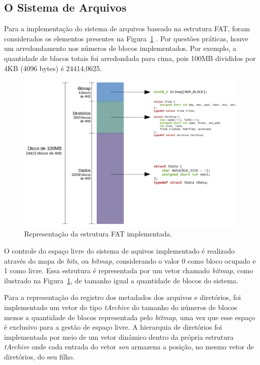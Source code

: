\documentclass[12pt]{article}
\begin{document}
\subsection{O Sistema de Arquivos}

Para a implementação do sistema de arquivos baseado na estrutura FAT, foram considerados os elementos presentes na Figura~\ref{fig:fat} \cite{tanenbaum:16}. Por questões práticas, houve um arredondamento nos números de blocos implementados. Por exemplo, a quantidade de blocos totais foi arredondada para cima, pois 100MB divididos por 4KB (4096 bytes) é 24414,0625.

\begin{figure}[H]
	\centering
	\includegraphics[width=1\textwidth]{fat.png}
	\caption{Representação da estrutura FAT implementada.}
	\label{fig:fat}
\end{figure}

O controle do espaço livre do sistema de aquivos implementado é realizado através do mapa de \textit{bits}, ou \textit{bitmap}, considerando o valor 0 como bloco ocupado e 1 como livre. Essa estrutura é representada por um vetor chamado \textit{bitmap}, como ilustrado na Figura~\ref{fig:fat}, de tamanho igual a quantidade de blocos do sistema.

Para a representação do registro dos metadados dos arquivos e diretórios, foi implementado um vetor do tipo \textit{tArchive} do tamanho do números de blocos menos a quantidade de blocos representada pelo \textit{bitmap}, uma vez que esse espaço é exclusivo para a gestão de espaço livre. A hierarquia de diretórios foi implementada por meio de um vetor dinâmico dentro da própria estrutura \textit{tArchive} onde cada entrada do vetor \textit{son} armazena a posição, no mesmo vetor de diretórios, do seu filho.
\end{document}
